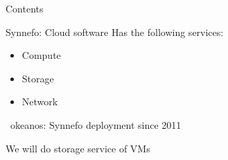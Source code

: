 \begin{frame}[t,plain]
\titlepage
\end{frame}

\begin{frame}[t]{Contents}
		
\end{frame}

\begin{frame}{}
	Synnefo: Cloud software
	Has the following services:
	\begin{itemize}
		\item Compute
		\item Storage
		\item Network
	\end{itemize}


	~okeanos: Synnefo deployment since 2011
\end{frame}

\begin{frame}
	We will do storage service
	\pause
	of VMs

\end{frame}


